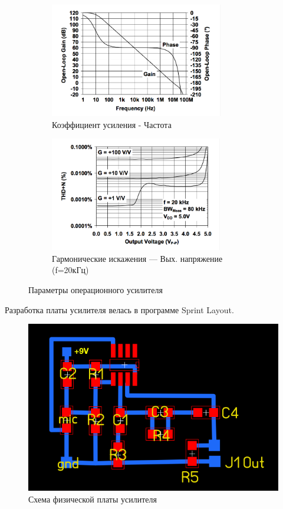 \begin{figure}[H]
\vspace{10mm} %

\begin{subfigure}{0.5\textwidth}
\includegraphics[width=0.9\linewidth, height=5cm]{op-amp-plot5.png} 
\caption{Коэффициент усиления - Частота}
\end{subfigure}
\begin{subfigure}{0.5\textwidth}
\includegraphics[width=0.9\linewidth, height=5cm]{op-amp-plot6.png}
\caption{\small{Гармонические искажения --- Вых. напряжение (f=20кГц)}}
\end{subfigure}

\caption{Параметры операционного усилителя}
\label{fig:image2}
\end{figure}

Разработка платы усилителя велась в программе Sprint Layout. 

\begin{figure}[H]
\centering
\includegraphics[width=\textwidth]{sprint-layout-circuit.png}
\caption{Схема физической платы усилителя}
\end{figure}

